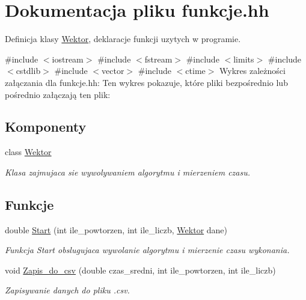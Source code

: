 \hypertarget{funkcje_8hh}{\section{\-Dokumentacja pliku funkcje.\-hh}
\label{funkcje_8hh}
}


\-Definicja klasy \hyperlink{class_wektor}{\-Wektor}, deklaracje funkcji uzytych w programie.  


{\ttfamily \#include $<$iostream$>$}\*
{\ttfamily \#include $<$fstream$>$}\*
{\ttfamily \#include $<$limits$>$}\*
{\ttfamily \#include $<$cstdlib$>$}\*
{\ttfamily \#include $<$vector$>$}\*
{\ttfamily \#include $<$ctime$>$}\*
\-Wykres zależności załączania dla funkcje.\-hh\-:
\-Ten wykres pokazuje, które pliki bezpośrednio lub pośrednio załączają ten plik\-:
\subsection*{\-Komponenty}
\begin{DoxyCompactItemize}
\item 
class \hyperlink{class_wektor}{\-Wektor}
\begin{DoxyCompactList}\small\item\em \-Klasa zajmujaca sie wywolywaniem algorytmu i mierzeniem czasu. \end{DoxyCompactList}\end{DoxyCompactItemize}
\subsection*{\-Funkcje}
\begin{DoxyCompactItemize}
\item 
double \hyperlink{funkcje_8hh_a6e69b8076e8103fe9d3a941fedbbbd5a}{\-Start} (int ile\-\_\-powtorzen, int ile\-\_\-liczb, \hyperlink{class_wektor}{\-Wektor} dane)
\begin{DoxyCompactList}\small\item\em \-Funkcja \-Start obslugujaca wywolanie algorytmu i mierzenie czasu wykonania. \end{DoxyCompactList}\item 
void \hyperlink{funkcje_8hh_addcaa6950d321eb4c005980d35423b27}{\-Zapis\-\_\-do\-\_\-csv} (double czas\-\_\-sredni, int ile\-\_\-powtorzen, int ile\-\_\-liczb)
\begin{DoxyCompactList}\small\item\em \-Zapisywanie danych do pliku .csv. \end{DoxyCompactList}\end{DoxyCompactItemize}


